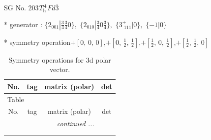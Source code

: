\documentclass[fleqn,8pt]{jsarticle}
\begin{document}
\setcounter{MaxMatrixCols}{32}

\renewcommand{\tablename}{Table~}
\renewcommand{\figurename}{Figure~}
\begin{center}
\LARGE
SG No. 203\quad$T_{\rm h}^{4}$\quad$Fd\bar{3}$\quad[ cubic ]
\end{center}

* generator : $\{2{}_{001}|\frac{3}{4} \frac{3}{4} 0\},\,\,\{2{}_{010}|\frac{3}{4} 0 \frac{3}{4}\},\,\,\{3^{+}_{\,\,111}|0\},\,\,\{-1|0\}$

* symmetry operation\quad$+\left[ 0,\, 0,\, 0 \right]$,\quad $+\left[ 0,\, \frac{1}{2},\, \frac{1}{2} \right]$,\quad $+\left[ \frac{1}{2},\, 0,\, \frac{1}{2} \right]$,\quad $+\left[ \frac{1}{2},\, \frac{1}{2},\, 0 \right]$
\renewcommand{\arraystretch}{1.3}
\begin{longtable}{cccc}
\caption{Symmetry operations for 3d polar vector.}
 \\
 \hline \hline
No. & tag & matrix (polar) & det \\ \hline \endfirsthead

\multicolumn{3}{l}{\tablename\ \thetable{}} \\
 \hline \hline
No. & tag & matrix (polar) & det \\ \hline \endhead

 \hline \hline
\multicolumn{3}{r}{\footnotesize\it continued ...} \\ \endfoot

 \hline \hline
\multicolumn{3}{r}{} \\ \endlastfoot


\end{longtable}
\end{document}
